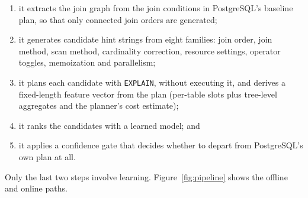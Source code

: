 \documentclass[conference]{IEEEtran}
\begin{document}
\begin{enumerate}
  \item it extracts the join graph from the join conditions in PostgreSQL's
  baseline plan, so that only connected join orders are generated;
  \item it generates candidate hint strings from eight families: join order,
  join method, scan method, cardinality correction, resource settings, operator
  toggles, memoization and parallelism;
  \item it plans each candidate with \texttt{EXPLAIN}, without executing it, and
  derives a fixed-length feature vector from the plan (per-table slots plus
  tree-level aggregates and the planner's cost estimate);
  \item it ranks the candidates with a learned model; and
  \item it applies a confidence gate that decides whether to depart from
  PostgreSQL's own plan at all.
\end{enumerate}

Only the last two steps involve learning. Figure~\ref{fig:pipeline} shows the
offline and online paths.
\end{document}
